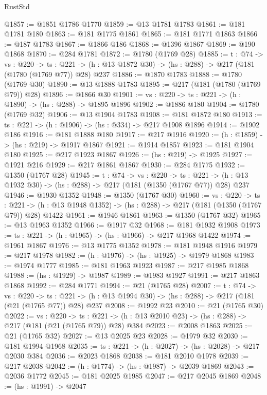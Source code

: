 \begin{lexlean}{RustStd}
\begin{coremodule}
@1857 := @1851 @1786 @1770
@1859 := @13 @1781 @1783
@1861 := @181 @1781 @180
@1863 := @181 @1775 @1861
@1865 := @181 @1771 @1863
@1866 := @187 @1783
@1867 := @1866 @186
@1868 := @1396 @1867
@1869 := @190 @1868
@1870 := @284 @1781
@1872 := @1780 (@1769 @28)
@1885 := {t : @74} ->
  {vs : @220} ->
  {ts : @221} -> (h : @13 @1872 @30) -> (hs : @288) -> @217 (@181 (@1780 (@1769 @77)) @28) @237
@1886 := @1870 @1783
@1888 := @1780 (@1769 @30)
@1890 := @13 @1888 @1783
@1895 := @217 (@181 (@1780 (@1769 @79)) @28)
@1896 := @1866 @30
@1901 := {vs : @220} -> {ts : @221} -> (h : @1890) -> (hs : @288) -> @1895 @1896
@1902 := @1886 @180
@1904 := @1780 (@1769 @32)
@1906 := @13 @1904 @1783
@1908 := @181 @1872 @180
@1913 := {ts : @221} -> (h : @1906) -> (hs : @334) -> @217 @1908 @1896
@1914 := @1902 @186
@1916 := @181 @1888 @180
@1917 := @217 @1916
@1920 := (h : @1859) -> (hs : @219) -> @1917 @1867
@1921 := @1914 @1857
@1923 := @181 @1904 @180
@1925 := @217 @1923 @1867
@1926 := (hs : @219) -> @1925
@1927 := @1921 @216
@1929 := @217 @1861 @1867
@1930 := @284 @1775
@1932 := @1350 (@1767 @28)
@1945 := {t : @74} ->
  {vs : @220} ->
  {ts : @221} -> (h : @13 @1932 @30) -> (hs : @288) -> @217 (@181 (@1350 (@1767 @77)) @28) @237
@1946 := @1930 @1352
@1948 := @1350 (@1767 @30)
@1960 := {vs : @220} ->
  {ts : @221} -> (h : @13 @1948 @1352) -> (hs : @288) -> @217 (@181 (@1350 (@1767 @79)) @28) @1422
@1961 := @1946 @1861
@1963 := @1350 (@1767 @32)
@1965 := @13 @1963 @1352
@1966 := @1917 @32
@1968 := @181 @1932 @1908
@1973 := {ts : @221} -> (h : @1965) -> (hs : @1966) -> @217 @1968 @1422
@1974 := @1961 @1867
@1976 := @13 @1775 @1352
@1978 := @181 @1948 @1916
@1979 := @217 @1978
@1982 := (h : @1976) -> (hs : @1925) -> @1979 @1868
@1983 := @1974 @1777
@1985 := @181 @1963 @1923
@1987 := @217 @1985 @1868
@1988 := (hs : @1929) -> @1987
@1989 := @1983 @1927
@1991 := @217 @1863 @1868
@1992 := @284 @1771
@1994 := @21 (@1765 @28)
@2007 := {t : @74} ->
  {vs : @220} ->
  {ts : @221} -> (h : @13 @1994 @30) -> (hs : @288) -> @217 (@181 (@21 (@1765 @77)) @28) @237
@2008 := @1992 @23
@2010 := @21 (@1765 @30)
@2022 := {vs : @220} ->
  {ts : @221} -> (h : @13 @2010 @23) -> (hs : @288) -> @217 (@181 (@21 (@1765 @79)) @28) @384
@2023 := @2008 @1863
@2025 := @21 (@1765 @32)
@2027 := @13 @2025 @23
@2028 := @1979 @32
@2030 := @181 @1994 @1968
@2035 := {ts : @221} -> (h : @2027) -> (hs : @2028) -> @217 @2030 @384
@2036 := @2023 @1868
@2038 := @181 @2010 @1978
@2039 := @217 @2038
@2042 := (h : @1774) -> (hs : @1987) -> @2039 @1869
@2043 := @2036 @1772
@2045 := @181 @2025 @1985
@2047 := @217 @2045 @1869
@2048 := (hs : @1991) -> @2047

\end{coremodule}
\end{lexlean}
